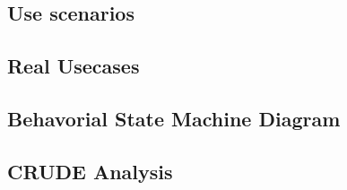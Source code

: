 \chapter{\babDelapan}

\section{Use scenarios}

\section{Real Usecases}

\section{Behavorial State Machine Diagram}

\section{CRUDE Analysis}

